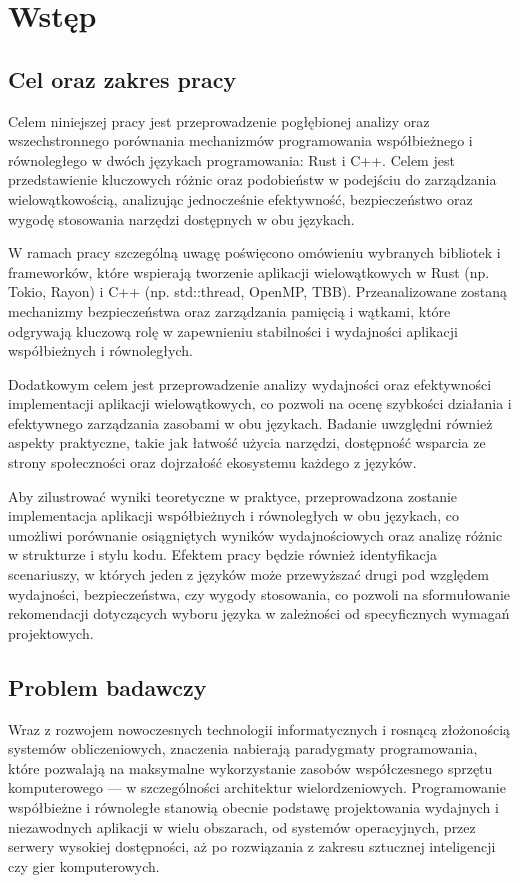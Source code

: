 \chapter[Wstęp]{Wstęp}
\section{Cel oraz zakres pracy}
Celem niniejszej pracy jest przeprowadzenie pogłębionej analizy oraz wszechstronnego porównania mechanizmów programowania współbieżnego i równoległego w dwóch językach programowania: Rust i C++. Celem jest przedstawienie kluczowych różnic oraz podobieństw w podejściu do zarządzania wielowątkowością, analizując jednocześnie efektywność, bezpieczeństwo oraz wygodę stosowania narzędzi dostępnych w obu językach.

W ramach pracy szczególną uwagę poświęcono omówieniu wybranych bibliotek i frameworków, które wspierają tworzenie aplikacji wielowątkowych w Rust (np. Tokio, Rayon) i C++ (np. std::thread, OpenMP, TBB). Przeanalizowane zostaną mechanizmy bezpieczeństwa oraz zarządzania pamięcią i wątkami, które odgrywają kluczową rolę w zapewnieniu stabilności i wydajności aplikacji współbieżnych i równoległych.

Dodatkowym celem jest przeprowadzenie analizy wydajności oraz efektywności implementacji aplikacji wielowątkowych, co pozwoli na ocenę szybkości działania i efektywnego zarządzania zasobami w obu językach. Badanie uwzględni również aspekty praktyczne, takie jak łatwość użycia narzędzi, dostępność wsparcia ze strony społeczności oraz dojrzałość ekosystemu każdego z języków.

Aby zilustrować wyniki teoretyczne w praktyce, przeprowadzona zostanie implementacja aplikacji współbieżnych i równoległych w obu językach, co umożliwi porównanie osiągniętych wyników wydajnościowych oraz analizę różnic w strukturze i stylu kodu. Efektem pracy będzie również identyfikacja scenariuszy, w których jeden z języków może przewyższać drugi pod względem wydajności, bezpieczeństwa, czy wygody stosowania, co pozwoli na sformułowanie rekomendacji dotyczących wyboru języka w zależności od specyficznych wymagań projektowych.
\section{Problem badawczy}
Wraz z rozwojem nowoczesnych technologii informatycznych i rosnącą złożonością systemów obliczeniowych, znaczenia nabierają paradygmaty programowania, które pozwalają na maksymalne wykorzystanie zasobów współczesnego sprzętu komputerowego — w szczególności architektur wielordzeniowych. Programowanie współbieżne i równoległe stanowią obecnie podstawę projektowania wydajnych i niezawodnych aplikacji w wielu obszarach, od systemów operacyjnych, przez serwery wysokiej dostępności, aż po rozwiązania z zakresu sztucznej inteligencji czy gier komputerowych.

